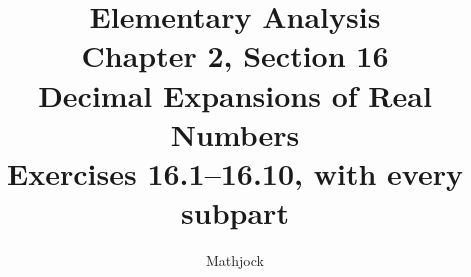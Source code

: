 
\title{\textbf{Elementary Analysis}\\[0.3em]
Chapter 2, Section 16\\[0.3em]
\large Decimal Expansions of Real Numbers\\
Exercises 16.1--16.10, with every subpart}
\author{Mathjock}
\date{}

\maketitle
\bookinfo
\tableofcontents
\clearpage
\setcounter{section}{15}


